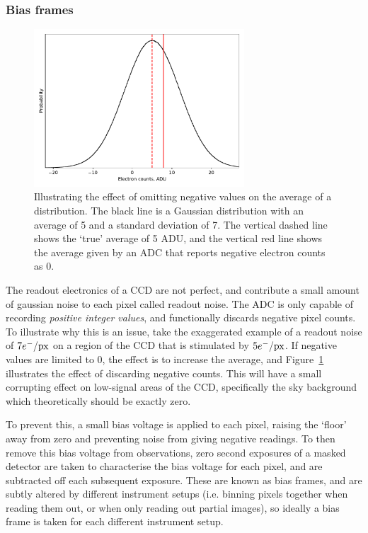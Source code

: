 \subsubsection{Bias frames}

\begin{figure}
    \centering
    \includegraphics[width=0.7\textwidth]{figures/observations/bias_frame_histogram.pdf}
    \caption{Illustrating the effect of omitting negative values on the average of a distribution. The black line is a Gaussian distribution with an average of 5 and a standard deviation of 7. The vertical dashed line shows the `true' average of 5 ADU, and the vertical red line shows the average given by an ADC that reports negative electron counts as 0.}
    \label{fig:observations:bias frame histogram}
\end{figure}
The readout electronics of a CCD are not perfect, and contribute a small amount of gaussian noise to each pixel called readout noise. The ADC is only capable of recording {\it positive integer values}, and functionally discards negative pixel counts. To illustrate why this is an issue, take the exaggerated example of a readout noise of $7 e^-/{\rm px}$ on a region of the CCD that is stimulated by $5 e^-/{\rm px}$. If negative values are limited to 0, the effect is to increase the average, and Figure~\ref{fig:observations:bias frame histogram} illustrates the effect of discarding negative counts.
This will have a small corrupting effect on low-signal areas of the CCD, specifically the sky background which theoretically should be exactly zero.

To prevent this, a small bias voltage is applied to each pixel, raising the `floor' away from zero and preventing noise from giving negative readings. To then remove this bias voltage from observations, zero second exposures of a masked detector are taken to characterise the bias voltage for each pixel, and are subtracted off each subsequent exposure. These are known as bias frames, and are subtly altered by different instrument setups (i.e. binning pixels together when reading them out, or when only reading out partial images), so ideally a bias frame is taken for each different instrument setup.


